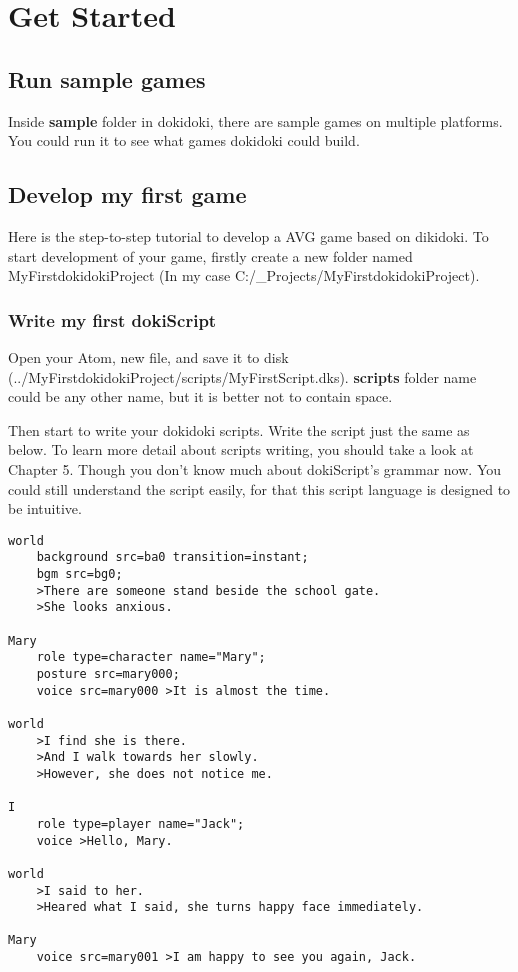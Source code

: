 \chapter{Get Started}

\section{Run sample games}

Inside \textbf{sample} folder in dokidoki, there are sample games on multiple platforms. You could run it to see what games dokidoki could build.

\section{Develop my first game}

Here is the step-to-step tutorial to develop a AVG game based on dikidoki. To start development of your game, firstly create a new folder named MyFirstdokidokiProject (In my case C:/\_Projects/MyFirstdokidokiProject).

\subsection{Write my first dokiScript}

Open your Atom, new file, and save it to disk (../MyFirstdokidokiProject/scripts/MyFirstScript.dks). \textbf{scripts} folder name could be any other name, but it is better not to contain space.

Then start to write your dokidoki scripts. Write the script just the same as below. To learn more detail about scripts writing, you should take a look at Chapter 5. Though you don't know much about dokiScript's grammar now. You could still understand the script easily, for that this script language is designed to be intuitive. 

\begin{lstlisting}
world
	background src=ba0 transition=instant;
	bgm src=bg0;
	>There are someone stand beside the school gate.
	>She looks anxious.

Mary
	role type=character name="Mary";
	posture src=mary000;
	voice src=mary000 >It is almost the time.

world
	>I find she is there.
	>And I walk towards her slowly.
	>However, she does not notice me.

I
	role type=player name="Jack";
	voice >Hello, Mary.

world
	>I said to her.
	>Heared what I said, she turns happy face immediately.

Mary
	voice src=mary001 >I am happy to see you again, Jack.
\end{lstlisting}


